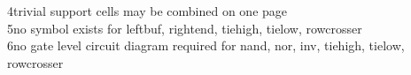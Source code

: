 \documentclass[11pt,a4paper]{article} %
\begin{document}
4trivial support cells may be combined on one page\\
5no symbol exists for leftbuf, rightend, tiehigh, tielow, rowcrosser\\
6no gate level circuit diagram required for nand, nor, inv, tiehigh, tielow, rowcrosser\\


%


%

%

 \newpage 


%

%

%

%
\end{document}
